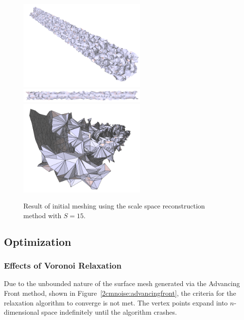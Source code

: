 \documentclass[12pt]{drexelthesis}
\let\Oldsubsection\subsection
\renewcommand{\subsection}{\FloatBarrier\Oldsubsection}
\let\Oldsubsubsection\subsubsection
\renewcommand{\subsubsection}{\FloatBarrier\Oldsubsubsection}
\begin{document}
\begin{figure}[!ht]
	
	\centering
		\includegraphics[width=2.5in]{simulated-lab-scan/2cmnoise/2cmmesh/scalespace1500.png}
		\includegraphics[width=2.5in]{simulated-lab-scan/2cmnoise/2cmmesh/scalespace1501.png}
		\includegraphics[width=2.5in]{simulated-lab-scan/2cmnoise/2cmmesh/scalespace1502.png}
		\caption[Initial meshing using a scale space reconstruction with $S = 15$]{\centering  Result of initial meshing using the scale space reconstruction method with $S = 15$.}
		\label{2cmnoise:scalespace15}
\end{figure}

\subsection{Optimization}
\subsubsection{Effects of Voronoi Relaxation}

Due to the unbounded nature of the surface mesh generated via the Advancing Front method, shown in Figure~\ref{2cmnoise:advancingfront}, the criteria for the relaxation algorithm to converge is not met. The vertex points expand into $n$-dimensional space indefinitely until the algorithm crashes. %
\end{document}
